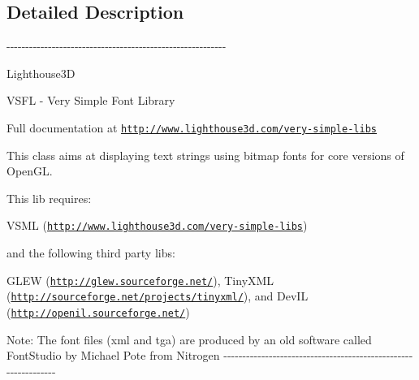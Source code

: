 \subsection{\-Detailed \-Description}
-\/-\/-\/-\/-\/-\/-\/-\/-\/-\/-\/-\/-\/-\/-\/-\/-\/-\/-\/-\/-\/-\/-\/-\/-\/-\/-\/-\/-\/-\/-\/-\/-\/-\/-\/-\/-\/-\/-\/-\/-\/-\/-\/-\/-\/-\/-\/-\/-\/-\/-\/-\/-\/-\/-\/-\/-\/-\/

\-Lighthouse3\-D

\-V\-S\-F\-L -\/ \-Very \-Simple \-Font \-Library

\-Full documentation at \href{http://www.lighthouse3d.com/very-simple-libs}{\tt http\-://www.\-lighthouse3d.\-com/very-\/simple-\/libs}

\-This class aims at displaying text strings using bitmap fonts for core versions of \-Open\-G\-L.

\-This lib requires\-:

\-V\-S\-M\-L (\href{http://www.lighthouse3d.com/very-simple-libs}{\tt http\-://www.\-lighthouse3d.\-com/very-\/simple-\/libs})

and the following third party libs\-:

\-G\-L\-E\-W (\href{http://glew.sourceforge.net/}{\tt http\-://glew.\-sourceforge.\-net/}), \-Tiny\-X\-M\-L (\href{http://sourceforge.net/projects/tinyxml/}{\tt http\-://sourceforge.\-net/projects/tinyxml/}), and \-Dev\-I\-L (\href{http://openil.sourceforge.net/}{\tt http\-://openil.\-sourceforge.\-net/})

\-Note\-: \-The font files (xml and tga) are produced by an old software called \-Font\-Studio by \-Michael \-Pote from \-Nitrogen -\/-\/-\/-\/-\/-\/-\/-\/-\/-\/-\/-\/-\/-\/-\/-\/-\/-\/-\/-\/-\/-\/-\/-\/-\/-\/-\/-\/-\/-\/-\/-\/-\/-\/-\/-\/-\/-\/-\/-\/-\/-\/-\/-\/-\/-\/-\/-\/-\/-\/-\/-\/-\/-\/-\/-\/-\/-\/-\/-\/-\/-\/-\/ 

